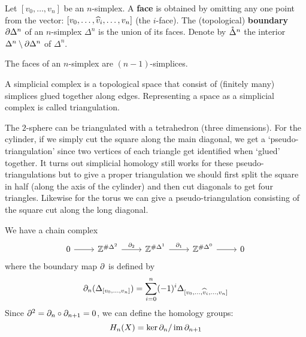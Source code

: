 \begin{defn}
  Let $[v_0,\ldots,v_n]$ be an $n$-simplex.
  A \textbf{face} is obtained by omitting any one point from the vector: $[v_0,\ldots,\widehat v_i,\ldots,v_n]$ (the $i$-face).
  The (topological) \textbf{boundary} $\partial \Delta^n$ of an $n$-simplex $\Delta^n$ is the union of its faces.
  Denote by $\mathring\Delta^n$ the interior $\Delta^n \setminus \partial\Delta^n$ of $\Delta^n$.
\end{defn}

\begin{rmk}
  The faces of an $n$-simplex are $(n-1)$-simplices.
\end{rmk}

\begin{defn}
  A simplicial complex is a topological space that consist of (finitely many) simplices glued together along edges.
  Representing a space as a simplicial complex is called triangulation.
\end{defn}

\begin{exam}
  The $2$-sphere can be triangulated with a tetrahedron (three dimensions).
  For the cylinder, if we simply cut the square along the main diagonal, we get a `pseudo-triangulation' since two vertices of each triangle get identified when `glued' together.
  It turns out simplicial homology still works for these pseudo-triangulations but to give a proper triangulation we should first split the square in half (along the axis of the cylinder) and then cut diagonals to get four triangles.
  Likewise for the torus we can give a pseudo-triangulation consisting of the square cut along the long diagonal.
\end{exam}

\begin{exam}
  We have a chain complex
  \begin{equation*}
    \begin{tikzcd}
      0 \ar[r] & \ZZ^{\# \Delta^2} \ar[r, "\p_2"] & \ZZ^{\#\Delta^1} \ar[r, "\p_1"] & \ZZ^{\#\Delta^0} \ar[r] & 0
    \end{tikzcd}
  \end{equation*}
  where the boundary map $\partial$ is defined by
  \[\partial_n(\Delta_{[v_0,\ldots,v_n]}) = \sum_{i=0}^n (-1)^i \Delta_{[v_0,\ldots,\widehat v_i,\ldots,v_n]}\]
  Since $\partial^2 = \partial_n \circ \partial_{n+1} = 0$, we can define the homology groups:
  \[H_n(X) = \ker\partial_n/\operatorname{im}\partial_{n+1}\]
\end{exam}

